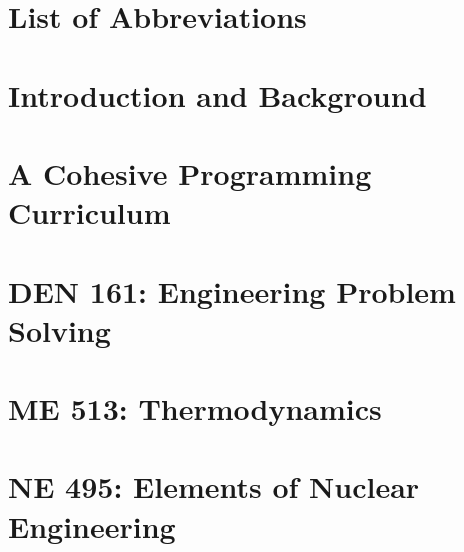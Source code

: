 \documentclass[12pt]{report}
\begin{document}
    

    
    
    


    \clearpage
    \setcounter{page}{1}
    \tableofcontents

    \clearpage
    \listoffigures


    \clearpage
    \listofassignments


    \clearpage
    \chapter*{List of Abbreviations}
    
    
    \clearpage
    \setcounter{page}{1}
    \chapter{Introduction and Background}
    

    \clearpage
    \chapter{A Cohesive Programming Curriculum}
    
    
    \clearpage
    \chapter{DEN 161: Engineering Problem Solving}
    

    \clearpage
    \chapter{ME 513: Thermodynamics}
    

    \clearpage
    \chapter{NE 495: Elements of Nuclear Engineering}
    
    
\end{document}
